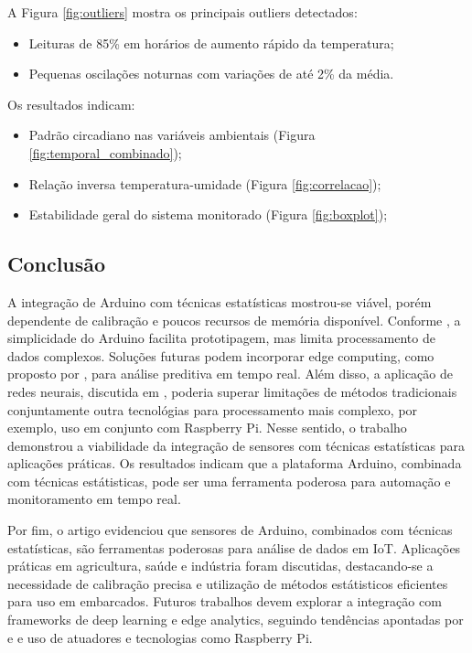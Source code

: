 \documentclass[12pt, a4paper]{article}
\begin{document}
A Figura \ref{fig:outliers} mostra os principais outliers detectados:
\begin{itemize}
    \item Leituras de 85\% em horários de aumento rápido da temperatura;
    \item Pequenas oscilações noturnas com variações de até 2\% da média.
\end{itemize}

Os resultados indicam:
\begin{itemize}
    \item Padrão circadiano nas variáveis ambientais (Figura \ref{fig:temporal_combinado});
    \item Relação inversa temperatura-umidade (Figura \ref{fig:correlacao});
    \item Estabilidade geral do sistema monitorado (Figura \ref{fig:boxplot});
\end{itemize}


\subsection{Conclusão}
\label{sec:Conclusão}
A integração de Arduino com técnicas estatísticas mostrou-se viável, porém dependente de calibração e
poucos recursos de memória disponível. Conforme \cite{Tasiran2019}, a simplicidade do Arduino facilita prototipagem, mas limita
processamento de dados complexos. Soluções futuras podem incorporar edge computing, como proposto por \cite{Selmy2024},
para análise preditiva em tempo real. Além disso, a aplicação de redes neurais, discutida em \cite{MAHDAVINEJAD2018161},
poderia superar limitações de métodos tradicionais conjuntamente outra tecnológias para processamento mais complexo, por exemplo, uso em conjunto com Raspberry Pi. Nesse sentido, o trabalho demonstrou a viabilidade da integração de sensores com técnicas estatísticas para aplicações práticas. Os resultados indicam que a plataforma Arduino, combinada
com técnicas estátisticas, pode ser uma ferramenta poderosa para automação e monitoramento em tempo real.


Por fim, o artigo evidenciou que sensores de Arduino, combinados com técnicas estatísticas, são ferramentas
poderosas para análise de dados em IoT. Aplicações práticas em agricultura, saúde e indústria foram discutidas,
destacando-se a necessidade de calibração precisa e utilização de métodos estátisticos eficientes para uso em embarcados. Futuros trabalhos
devem explorar a integração com frameworks de deep learning e edge analytics, seguindo tendências apontadas por
\cite{Adi2020} e \cite{Selmy2024} e uso de atuadores e tecnologias como Raspberry Pi. 

\end{document}
